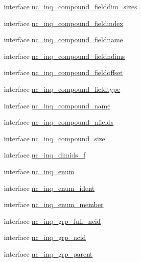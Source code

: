 \begin{DoxyCompactItemize}
\item 
interface \hyperlink{interfacenetcdf4__nc__interfaces_1_1nc__inq__compound__fielddim__sizes}{nc\+\_\+inq\+\_\+compound\+\_\+fielddim\+\_\+sizes}
\item 
interface \hyperlink{interfacenetcdf4__nc__interfaces_1_1nc__inq__compound__fieldindex}{nc\+\_\+inq\+\_\+compound\+\_\+fieldindex}
\item 
interface \hyperlink{interfacenetcdf4__nc__interfaces_1_1nc__inq__compound__fieldname}{nc\+\_\+inq\+\_\+compound\+\_\+fieldname}
\item 
interface \hyperlink{interfacenetcdf4__nc__interfaces_1_1nc__inq__compound__fieldndims}{nc\+\_\+inq\+\_\+compound\+\_\+fieldndims}
\item 
interface \hyperlink{interfacenetcdf4__nc__interfaces_1_1nc__inq__compound__fieldoffset}{nc\+\_\+inq\+\_\+compound\+\_\+fieldoffset}
\item 
interface \hyperlink{interfacenetcdf4__nc__interfaces_1_1nc__inq__compound__fieldtype}{nc\+\_\+inq\+\_\+compound\+\_\+fieldtype}
\item 
interface \hyperlink{interfacenetcdf4__nc__interfaces_1_1nc__inq__compound__name}{nc\+\_\+inq\+\_\+compound\+\_\+name}
\item 
interface \hyperlink{interfacenetcdf4__nc__interfaces_1_1nc__inq__compound__nfields}{nc\+\_\+inq\+\_\+compound\+\_\+nfields}
\item 
interface \hyperlink{interfacenetcdf4__nc__interfaces_1_1nc__inq__compound__size}{nc\+\_\+inq\+\_\+compound\+\_\+size}
\item 
interface \hyperlink{interfacenetcdf4__nc__interfaces_1_1nc__inq__dimids__f}{nc\+\_\+inq\+\_\+dimids\+\_\+f}
\item 
interface \hyperlink{interfacenetcdf4__nc__interfaces_1_1nc__inq__enum}{nc\+\_\+inq\+\_\+enum}
\item 
interface \hyperlink{interfacenetcdf4__nc__interfaces_1_1nc__inq__enum__ident}{nc\+\_\+inq\+\_\+enum\+\_\+ident}
\item 
interface \hyperlink{interfacenetcdf4__nc__interfaces_1_1nc__inq__enum__member}{nc\+\_\+inq\+\_\+enum\+\_\+member}
\item 
interface \hyperlink{interfacenetcdf4__nc__interfaces_1_1nc__inq__grp__full__ncid}{nc\+\_\+inq\+\_\+grp\+\_\+full\+\_\+ncid}
\item 
interface \hyperlink{interfacenetcdf4__nc__interfaces_1_1nc__inq__grp__ncid}{nc\+\_\+inq\+\_\+grp\+\_\+ncid}
\item 
interface \hyperlink{interfacenetcdf4__nc__interfaces_1_1nc__inq__grp__parent}{nc\+\_\+inq\+\_\+grp\+\_\+parent}

\end{DoxyCompactItemize}

